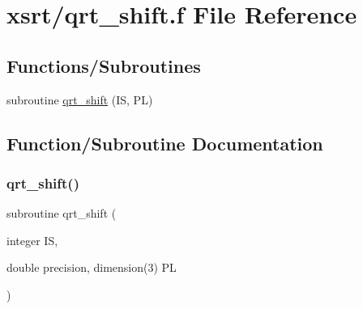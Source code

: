 \hypertarget{qrt__shift_8f}{}\section{xsrt/qrt\+\_\+shift.f File Reference}
\label{qrt__shift_8f}
\subsection*{Functions/\+Subroutines}
\begin{DoxyCompactItemize}
\item 
subroutine \hyperlink{qrt__shift_8f_a6021fbb66eed63f0192fb8bd9cb043b6}{qrt\+\_\+shift} (IS, PL)
\end{DoxyCompactItemize}


\subsection{Function/\+Subroutine Documentation}
\mbox{\label{qrt__shift_8f_a6021fbb66eed63f0192fb8bd9cb043b6}} 
\subsubsection{\texorpdfstring{qrt\+\_\+shift()}{qrt\_shift()}}
{\footnotesize\ttfamily subroutine qrt\+\_\+shift (\begin{DoxyParamCaption}\item[{integer}]{IS,  }\item[{double precision, dimension(3)}]{PL }\end{DoxyParamCaption})}

